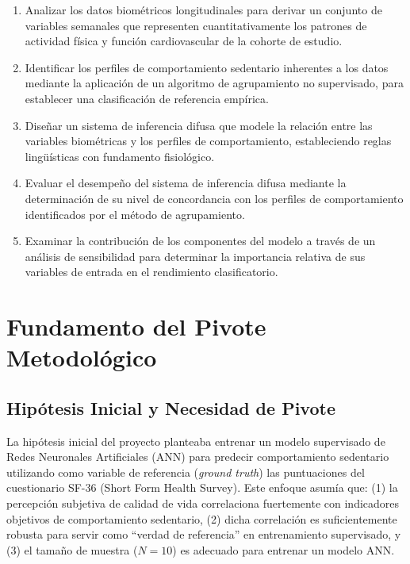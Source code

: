 \begin{enumerate}
    \item Analizar los datos biométricos longitudinales para derivar un conjunto de variables semanales que representen cuantitativamente los patrones de actividad física y función cardiovascular de la cohorte de estudio.
    
    \item Identificar los perfiles de comportamiento sedentario inherentes a los datos mediante la aplicación de un algoritmo de agrupamiento no supervisado, para establecer una clasificación de referencia empírica.
    
    \item Diseñar un sistema de inferencia difusa que modele la relación entre las variables biométricas y los perfiles de comportamiento, estableciendo reglas lingüísticas con fundamento fisiológico.
    
    \item Evaluar el desempeño del sistema de inferencia difusa mediante la determinación de su nivel de concordancia con los perfiles de comportamiento identificados por el método de agrupamiento.
    
    \item Examinar la contribución de los componentes del modelo a través de un análisis de sensibilidad para determinar la importancia relativa de sus variables de entrada en el rendimiento clasificatorio.
\end{enumerate}

\section{Fundamento del Pivote Metodológico}
\label{sec:fundamento_pivote}

\subsection{Hipótesis Inicial y Necesidad de Pivote}
\label{subsec:hipotesis_inicial_pivote}

La hipótesis inicial del proyecto planteaba entrenar un modelo supervisado de Redes Neuronales Artificiales (ANN) para predecir comportamiento sedentario utilizando como variable de referencia (\textit{ground truth}) las puntuaciones del cuestionario SF-36 (Short Form Health Survey). Este enfoque asumía que: (1) la percepción subjetiva de calidad de vida correlaciona fuertemente con indicadores objetivos de comportamiento sedentario, (2) dicha correlación es suficientemente robusta para servir como ``verdad de referencia'' en entrenamiento supervisado, y (3) el tamaño de muestra ($N=10$) es adecuado para entrenar un modelo ANN.

